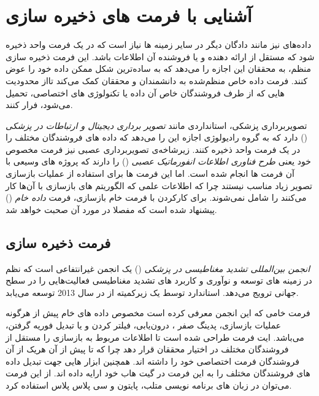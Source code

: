 \FloatBarrier
\section{آشنایی با فرمت های ذخیره سازی}\label{ch:background|sec:format-storage}

داده‌های \mri نیز مانند دادگان دیگر در سایر زمینه ها نیاز است که در یک فرمت واحد ذخیره شود که مستقل از ارائه دهنده و یا فروشنده آن اطلاعات باشد. این فرمت ذخیره سازی منظم، به محققان این اجازه را می‌دهد که به ساده‌ترین شکل ممکن داده‌ خود را عوض کنند.
فرمت داده خاص منظم‌شده 
به دانشمندان و محققان کمک می‌کند تااز محدودیت هایی که از طرف فروشندگان خاص آن داده یا تکنولوژی های اختصاصی، تحمیل می‌شود، فرار کنند.

تصویربرداری پزشکی، استانداردی مانند\textit{ تصویر برداری دیجیتال و ارتباطات در پزشکی}
()
دارد که به گروه رادیولوژی اجازه این را می‌دهد که داده های فروشندگان مختلف را در یک فرمت واحد ذخیره کنند.
زیرشاخه‌ی تصویربرداری عصبی نیز فرمت مخصوص خود یعنی \textit{طرح فناوری اطلاعات انفورماتیک عصبی}
()
را دارند که پروژه های وسیعی با آن فرمت ها انجام شده است.
اما این فرمت ها برای استفاده از عملیات بازسازی تصویر زیاد مناسب نیستند چرا که اطلاعات علمی که الگوریتم های
بازسازی با آن‌ها کار می‌کنند را شامل نمی‌شوند.
برای کارکردن با فرمت خام بازسازی، فرمت \textit{داده خام }
()
پیشنهاد شده است که مفصلا در مورد آن صحبت خواهد شد.




\subsection{فرمت ذخیره سازی}

\textit{انجمن بین‌المللی تشدید مغناطیسی در پزشکی}
()
یک انجمن غیرانتفاعی است که نظم در زمینه های توسعه و نوآوری و کاربرد های تشدید مغناطیسی فعالیت‌هایی را در سطح جهانی ترویج می‌دهد.
\cite{wiki:International_Society_for_Magnetic_Resonance_in_Medicine}
استاندارد 
توسط یک زیرکمیته از  در سال 2013 توسعه می‌یابد.

فرمت خامی که این انجمن معرفی کرده است مخصوص داده های خام \mri پیش از هرگونه عملیات بازسازی، پدینگ صفر
، درون‌یابی، فیلتر کردن و یا تبدیل فوریه گرفتن، می‌باشد. ایت فرمت طراحی شده است تا اطلاعات مربوط به بازسازی را مستقل از فروشندگان مختلف \mri در اختیار محققان قرار دهد چرا که تا پیش از آن هریک از آن فروشندگان فرمت اختصاصی خود را داشته اند. همچنین ابزار هایی جهت تبدیل داده های فروشندگان مختلف را به این فرمت در گیت هاب خود ارایه داده اند. از این فرمت می‌توان در زبان های برنامه نویسی متلب، پایتون و سی پلاس پلاس استفاده کرد. 
\cite{ISMRM}

